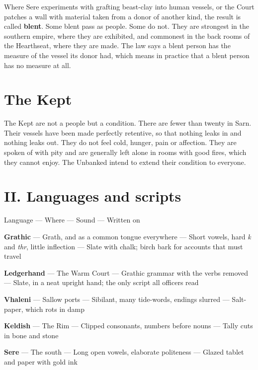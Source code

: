 \documentclass{design/chronicle}
\begin{document}
Where Sere experiments with grafting beast-clay into human vessels, or the Court patches a wall with material taken from a donor of another kind, the result is called \textbf{blent}. Some blent pass as people. Some do not. They are strongest in the southern empire, where they are exhibited, and commonest in the back rooms of the Hearthseat, where they are made. The law says a blent person has the measure of the vessel its donor had, which means in practice that a blent person has no measure at all.

\section*{The Kept}

The Kept are not a people but a condition. There are fewer than twenty in Sarn. Their vessels have been made perfectly retentive, so that nothing leaks in and nothing leaks out. They do not feel cold, hunger, pain or affection. They are spoken of with pity and are generally left alone in rooms with good fires, which they cannot enjoy. The Unbanked intend to extend their condition to everyone.

\CRrule

\section*{II. Languages and scripts}

Language — Where — Sound — Written on\par

\textbf{Grathic} — Grath, and as a common tongue everywhere — Short vowels, hard \emph{k} and \emph{thr}, little inflection — Slate with chalk; birch bark for accounts that must travel\par

\textbf{Ledgerhand} — The Warm Court — Grathic grammar with the verbs removed — Slate, in a neat upright hand; the only script all officers read\par

\textbf{Vhaleni} — Sallow ports — Sibilant, many tide-words, endings slurred — Salt-paper, which rots in damp\par

\textbf{Keldish} — The Rim — Clipped consonants, numbers before nouns — Tally cuts in bone and stone\par

\textbf{Sere} — The south — Long open vowels, elaborate politeness — Glazed tablet and paper with gold ink\par
\end{document}

